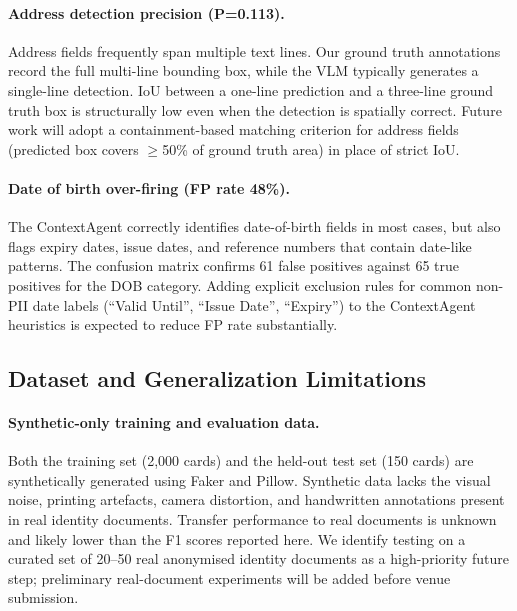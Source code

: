 \paragraph{Address detection precision (P=0.113).}
Address fields frequently span multiple text lines.
Our ground truth annotations record the full
multi-line bounding box, while the VLM typically
generates a single-line detection.
IoU between a one-line prediction and a three-line
ground truth box is structurally low even when
the detection is spatially correct.
Future work will adopt a containment-based matching
criterion for address fields (predicted box covers
$\geq$50\% of ground truth area) in place of strict
IoU.
 
\paragraph{Date of birth over-firing (FP rate 48\%).}
The ContextAgent correctly identifies date-of-birth
fields in most cases, but also flags expiry dates,
issue dates, and reference numbers that contain
date-like patterns.
The confusion matrix confirms 61 false positives
against 65 true positives for the DOB category.
Adding explicit exclusion rules for common non-PII
date labels (``Valid Until'', ``Issue Date'',
``Expiry'') to the ContextAgent heuristics is
expected to reduce FP rate substantially.
 
\subsection{Dataset and Generalization Limitations}
 
\paragraph{Synthetic-only training and evaluation data.}
Both the training set (2,000 cards) and the held-out
test set (150 cards) are synthetically generated using
Faker and Pillow.
Synthetic data lacks the visual noise, printing
artefacts, camera distortion, and handwritten
annotations present in real identity documents.
Transfer performance to real documents is unknown and
likely lower than the F1 scores reported here.
We identify testing on a curated set of 20--50
real anonymised identity documents as a high-priority
future step; preliminary real-document experiments will
be added before venue submission.
 
